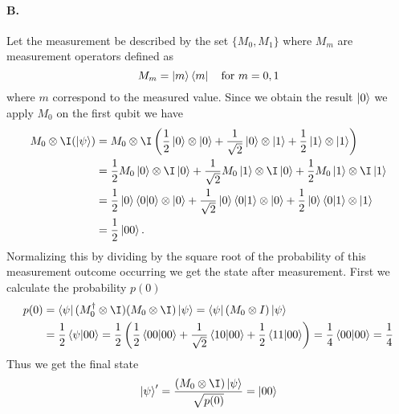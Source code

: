 \paragraph{B.} Let the measurement be described by the set $\{M_0, M_1\}$ where $M_m$ are measurement operators defined as
\begin{equation*}
    M_m = \ket{m}\bra{m} \quad \text{for } m = 0,1
\end{equation*}
where $m$ correspond to the measured value. Since we obtain the result $\ket{0}$ we apply $M_0$ on the first qubit we have 
\begin{align*}
    M_0 \otimes \I (\ket{\psi}) &= M_0 \otimes \I \left( \frac{1}{2} \ket{0} \otimes \ket{0} + \frac{1}{\sqrt{2}} \ket{0} \otimes \ket{1} + \frac{1}{2} \ket{1} \otimes \ket{1} \right)\\
    &= \frac{1}{2} M_0\ket{0} \otimes \I \ket{0} + \frac{1}{\sqrt{2}} M_0 \ket{1} \otimes \I \ket{0} + \frac{1}{2} M_0 \ket{1} \otimes \I \ket{1}\\
    &= \frac{1}{2} \ket{0} \bra{0} \ket{0} \otimes \ket{0} + \frac{1}{\sqrt{2}} \ket{0} \bra{0} \ket{1} \otimes \ket{0} + \frac{1}{2} \ket{0} \bra{0} \ket{1} \otimes \ket{1}\\
    &= \frac{1}{2} \ket{00}.
\end{align*}
Normalizing this by dividing by the square root of the probability of this measurement outcome occurring we get the state after measurement. First we calculate the probability $p(0)$
\begin{align*}
    p(0) &= \bra{\psi} (M_0^\dagger \otimes \I)(M_0 \otimes \I )\ket{\psi}  = \bra{\psi} (M_0 \otimes I) \ket{\psi}\\
    &= \frac{1}{2}\bra{\psi} \ket{00} = \frac{1}{2} \left(  \frac{1}{2} \bra{00}\ket{00} + \frac{1}{\sqrt{2}} \bra{10}\ket{00} + \frac{1}{2}\bra{11}\ket{00} \right) = \frac{1}{4}\bra{00}\ket{00} = \frac{1}{4}
\end{align*}
Thus we get the final state
\begin{equation*}
    \ket{\psi}' = \frac{(M_0 \otimes \I)\ket{\psi}}{\sqrt{p(0)}} = \ket{00}
\end{equation*}

